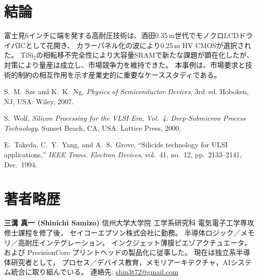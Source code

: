 \documentclass[conference]{IEEEtran}
\begin{document}
\section{結論}
富士見6インチに端を発する高耐圧技術は、酒田0.35\,\textmu m世代でモノクロLCDドライバICとして花開き、  
カラーパネル化の波により0.25\,\textmu m HV CMOSが選択された。  
TiSi$_2$の相転移不完全性により大容量SRAMで新たな課題が顕在化したが、対策により量産は成立し、市場競争力を維持できた。  
本事例は、市場要求と技術的制約の相互作用を示す産業史的に重要なケーススタディである。

\begin{thebibliography}{3}

S.~M.~Sze and K.~K.~Ng, \emph{Physics of Semiconductor Devices}, 3rd~ed.
Hoboken, NJ, USA: Wiley, 2007.

S.~Wolf, \emph{Silicon Processing for the VLSI Era, Vol.~4: Deep-Submicron Process Technology}.
Sunset Beach, CA, USA: Lattice Press, 2000.

E.~Takeda, C.~Y.~Yang, and A.~S.~Grove, ``Silicide technology for ULSI applications,''
\emph{IEEE Trans. Electron Devices}, vol.~41, no.~12, pp.~2133--2141, Dec.~1994.

\end{thebibliography}

\section*{著者略歴}
\noindent\textbf{三溝 真一 (Shinichi Samizo)}  
信州大学大学院 工学系研究科 電気電子工学専攻修士課程を修了後，  
セイコーエプソン株式会社に勤務。  
半導体ロジック／メモリ／高耐圧インテグレーション，  
インクジェット薄膜ピエゾアクチュエータ，  
および PrecisionCore プリントヘッドの製品化に従事した。  
現在は独立系半導体研究者として，  
プロセス／デバイス教育，メモリアーキテクチャ，AIシステム統合に取り組んでいる。  
連絡先: \href{mailto:shin3t72@gmail.com}{shin3t72@gmail.com}
\end{document}
